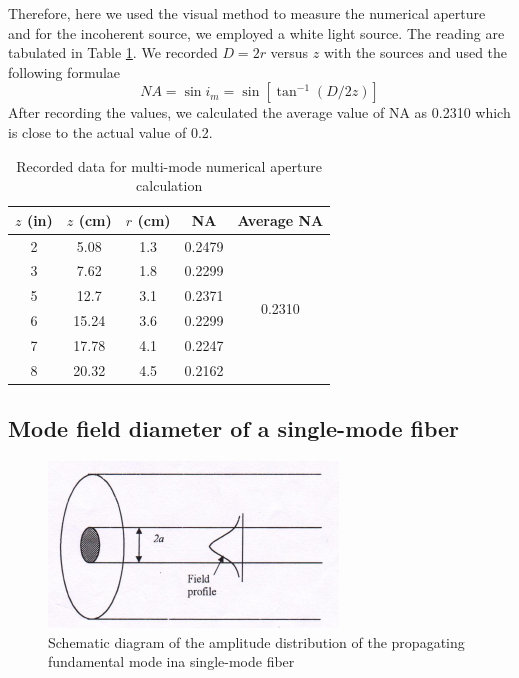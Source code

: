 \documentclass[%
 reprint,
nofootinbib,
 amsmath,amssymb,
 aps,
]{revtex4-2}
\begin{document}
Therefore, here we used the visual method to measure the numerical aperture and for the incoherent source, we employed a white light source. The reading are tabulated in Table \ref{tab:mmNA}. We recorded $ D = 2r $ versus $ z $ with the sources and used the following formulae
\begin{equation}\label{key}
	NA = \sin i_m = \sin[\tan^{-1}(D/2z)]
\end{equation}
After recording the values, we calculated the average value of NA as 0.2310 which is close to the actual value of 0.2.
\begin{table}[]
	\caption{Recorded data for multi-mode numerical aperture calculation}
	\label{tab:mmNA}
	\setlength{\tabcolsep}{12pt}
	\begin{tabular}{@{}ccccc@{}}
		\toprule
		$ z $ (in) & $ z $ (cm)  & $ r $ (cm) &  NA  &            Average NA             \\ \midrule
		2      & 5.08  & 1.3  & 0.2479 & \multirow{6}{*}{0.2310} \\
		3      & 7.62  & 1.8  & 0.2299 &                         \\
		5      & 12.7  & 3.1  & 0.2371 &                         \\
		6      & 15.24 & 3.6  & 0.2299 &                         \\
		7      & 17.78 & 4.1  & 0.2247 &                         \\
		8      & 20.32 & 4.5  & 0.2162 &                         \\ \bottomrule
	\end{tabular}
\end{table}
\subsection{Mode field diameter of a single-mode fiber}
\begin{figure}
	\centering
	\includegraphics[scale = 0.7]{mfd}
	\caption{Schematic diagram of the amplitude distribution of the propagating fundamental
		mode ina single-mode fiber}
	\label{fig:mfd}
\end{figure}
\end{document}
